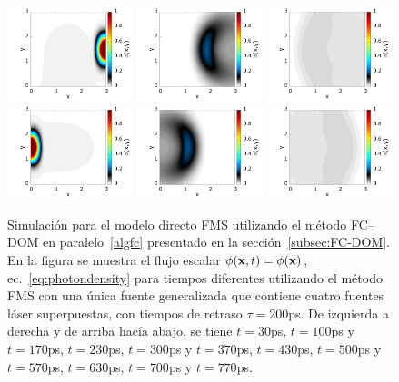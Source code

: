\begin{figure}[h!]
  \includegraphics[width=0.325\textwidth]{figuras/sim_FMS_t430.png}
  \includegraphics[width=0.325\textwidth]{figuras/sim_FMS_t500.png}
  \includegraphics[width=0.325\textwidth]{figuras/sim_FMS_t570.png}\\
  \includegraphics[width=0.325\textwidth]{figuras/sim_FMS_t630.png}
  \includegraphics[width=0.325\textwidth]{figuras/sim_FMS_t700.png}
  \includegraphics[width=0.325\textwidth]{figuras/sim_FMS_t770.png}
  \caption{Simulación para el modelo directo FMS utilizando 
  el método FC--DOM en paralelo~\ref{algfc} presentado en 
  la sección~\ref{subsec:FC-DOM}. En la figura se muestra el 
  flujo escalar $\phi(\mathbf{x},t)=\phi(\mathbf{x})$, ec.~\eqref{eq:photondensity} para tiempos 
  diferentes utilizando el método FMS con una única fuente generalizada 
  que contiene cuatro fuentes láser superpuestas, con tiempos de retraso $\tau=200$ps. De 
  izquierda a derecha y de arriba hacía abajo, se tiene $t=30$ps, $t=100$ps y $t=170$ps, 
   $t=230$ps, $t=300$ps y $t=370$ps,  $t=430$ps, $t=500$ps y $t=570$ps, 
    $t=630$ps, $t=700$ps y $t=770$ps.}
 \label{fig:photonflux2}
\end{figure}

